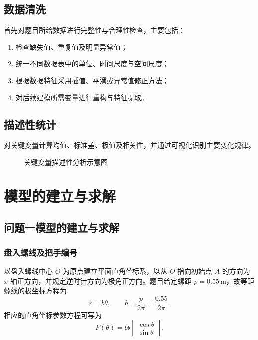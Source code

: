 \documentclass[UTF8,fontset=windows,a4paper,12pt]{ctexart}
\begin{document}
\subsection{数据清洗}

首先对题目所给数据进行完整性与合理性检查，主要包括：
\begin{enumerate}
  \item 检查缺失值、重复值及明显异常值；
  \item 统一不同数据表中的单位、时间尺度与空间尺度；
  \item 根据数据特征采用插值、平滑或异常值修正方法；
  \item 对后续建模所需变量进行重构与特征提取。
\end{enumerate}

\subsection{描述性统计}

对关键变量计算均值、标准差、极值及相关性，并通过可视化识别主要变化规律。

\begin{figure}[H]
  \centering
  \fbox{\rule{0pt}{4.5cm}\rule{0.78\textwidth}{0pt}}
  \caption{关键变量描述性分析示意图}
  \label{fig:eda}
\end{figure}


\section{模型的建立与求解}

\subsection{问题一模型的建立与求解}

\subsubsection{盘入螺线及把手编号}

以盘入螺线中心 $O$ 为原点建立平面直角坐标系，以从 $O$ 指向初始点
$A$ 的方向为 $x$ 轴正方向，并规定逆时针方向为极角正方向。题目给定螺距
$p=0.55\,\mathrm{m}$，故等距螺线的极坐标方程为
\begin{equation}
  r=b\theta,\qquad b=\frac{p}{2\pi}=\frac{0.55}{2\pi}.
  \label{eq:q1-spiral}
\end{equation}
相应的直角坐标参数方程可写为
\begin{equation}
  P(\theta)
  =b\theta
  \begin{bmatrix}
    \cos\theta\\
    \sin\theta
  \end{bmatrix}.
  \label{eq:q1-coordinate}
\end{equation}
\end{document}
